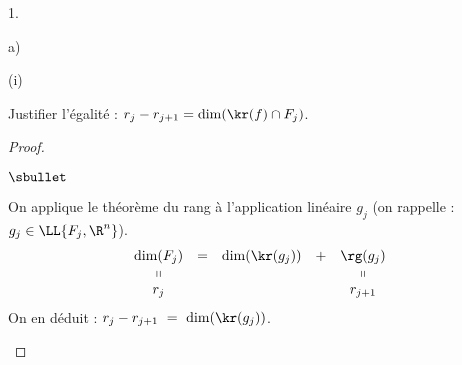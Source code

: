 \begin{noliste}{1.}
\begin{noliste}{a)}

    \begin{nonoliste}{(i)}
      \setcounter{enumiii}{1}
    \item Justifier l'égalité : $r_j-r_{j+1}=\dim(\kr(f) \cap F_j)$.
      
      \begin{proof}~
        \begin{noliste}{$\sbullet$}
        \item On applique le théorème du rang à l'application linéaire
          $g_j$ (on rappelle : $g_j \in \LL{F_j,\R^n}$).
	  \[
	    \begin{array}{ccccc}
	      \dim(F_j) &=& \dim(\kr(g_j)) & + & \rg(g_j)
	      \\
	      \shortparallel & & & & \shortparallel
	      \\
	      r_j & & & & r_{j+1}
	    \end{array}
	  \]
	  On en déduit : $r_j-r_{j+1} \ = \ \dim(\kr(g_j))$.
	  

\end{noliste}
\end{proof}
\end{nonoliste}
\end{noliste}
\end{noliste}

